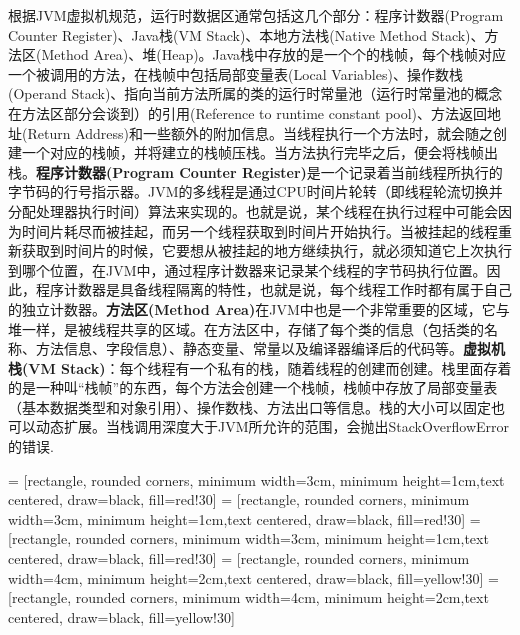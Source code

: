 \documentclass[../../../interview-questions.tex]{subfiles}
\begin{document}
根据JVM虚拟机规范，运行时数据区通常包括这几个部分：程序计数器(Program Counter Register)、Java栈(VM Stack)、本地方法栈(Native Method Stack)、方法区(Method Area)、堆(Heap)。Java栈中存放的是一个个的栈帧，每个栈帧对应一个被调用的方法，在栈帧中包括局部变量表(Local Variables)、操作数栈(Operand Stack)、指向当前方法所属的类的运行时常量池（运行时常量池的概念在方法区部分会谈到）的引用(Reference to runtime constant pool)、方法返回地址(Return Address)和一些额外的附加信息。当线程执行一个方法时，就会随之创建一个对应的栈帧，并将建立的栈帧压栈。当方法执行完毕之后，便会将栈帧出栈。\textbf{程序计数器(Program Counter Register)}是一个记录着当前线程所执行的字节码的行号指示器。JVM的多线程是通过CPU时间片轮转（即线程轮流切换并分配处理器执行时间）算法来实现的。也就是说，某个线程在执行过程中可能会因为时间片耗尽而被挂起，而另一个线程获取到时间片开始执行。当被挂起的线程重新获取到时间片的时候，它要想从被挂起的地方继续执行，就必须知道它上次执行到哪个位置，在JVM中，通过程序计数器来记录某个线程的字节码执行位置。因此，程序计数器是具备线程隔离的特性，也就是说，每个线程工作时都有属于自己的独立计数器。\textbf{方法区(Method Area)}在JVM中也是一个非常重要的区域，它与堆一样，是被线程共享的区域。在方法区中，存储了每个类的信息（包括类的名称、方法信息、字段信息）、静态变量、常量以及编译器编译后的代码等。\textbf{虚拟机栈(VM Stack)}：每个线程有一个私有的栈，随着线程的创建而创建。栈里面存着的是一种叫“栈帧”的东西，每个方法会创建一个栈帧，栈帧中存放了局部变量表（基本数据类型和对象引用）、操作数栈、方法出口等信息。栈的大小可以固定也可以动态扩展。当栈调用深度大于JVM所允许的范围，会抛出StackOverflowError的错误.

 = [rectangle, rounded corners, minimum width=3cm, minimum height=1cm,text centered, draw=black, fill=red!30]
 = [rectangle, rounded corners, minimum width=3cm, minimum height=1cm,text centered, draw=black, fill=red!30]
 = [rectangle, rounded corners, minimum width=3cm, minimum height=1cm,text centered, draw=black, fill=red!30]
 = [rectangle, rounded corners, minimum width=4cm, minimum height=2cm,text centered, draw=black, fill=yellow!30]
 = [rectangle, rounded corners, minimum width=4cm, minimum height=2cm,text centered, draw=black, fill=yellow!30]
\end{document}
